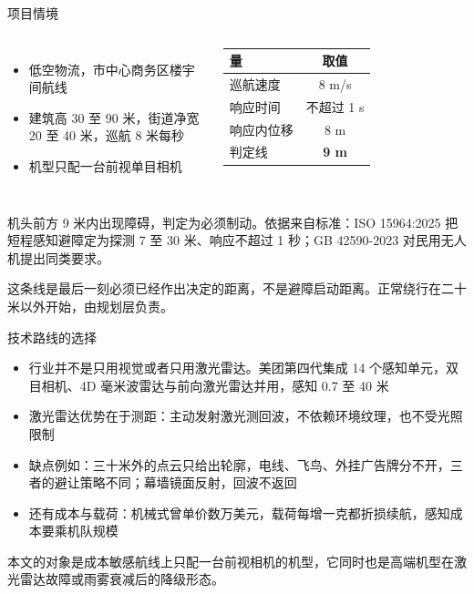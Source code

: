 \documentclass[serif, aspectratio=169]{beamer}
\newcommand{\currentref}{}
\newcommand{\src}[1]{\gdef\currentref{#1}}
\begin{document}
\begin{frame}{项目情境}

\begin{columns}[T]
\begin{itemize}
    \item 低空物流，市中心商务区楼宇间航线
    \item 建筑高 30 至 90 米，街道净宽 20 至 40 米，巡航 8 米每秒
    \item 机型只配一台前视单目相机
\end{itemize}

\centering
\small
\begin{tabular}{@{}lc@{}}
\toprule
量 & 取值 \\
\midrule
巡航速度 & 8 m/s \\
响应时间 & 不超过 1 s \\
响应内位移 & 8 m \\
判定线 & \textbf{9 m} \\
\bottomrule
\end{tabular}
\end{columns}

\vspace{0.25cm}
机头前方 9 米内出现障碍，判定为必须制动。依据来自标准：ISO 15964:2025 把短程感知避障定为探测 7 至 30 米、响应不超过 1 秒；GB 42590-2023 对民用无人机提出同类要求。

\vspace{0.15cm}
{\small 这条线是最后一刻必须已经作出决定的距离，不是避障启动距离。正常绕行在二十米以外开始，由规划层负责。}

\src{ISO 15964:2025. Detection and avoidance systems for uncrewed aircraft systems. ISO, 2025.}
\end{frame}

\begin{frame}{技术路线的选择}

{\footnotesize
\begin{itemize}\setlength{\itemsep}{1pt}
    \item 行业并不是只用视觉或者只用激光雷达。美团第四代集成 14 个感知单元，双目相机、4D 毫米波雷达与前向激光雷达并用，感知 0.7 至 40 米
    \item 激光雷达优势在于测距：主动发射激光测回波，不依赖环境纹理，也不受光照限制
    \item 缺点例如：三十米外的点云只给出轮廓，电线、飞鸟、外挂广告牌分不开，三者的避让策略不同；幕墙镜面反射，回波不返回
    \item 还有成本与载荷：机械式曾单价数万美元，载荷每增一克都折损续航，感知成本要乘机队规模
\end{itemize}}

\vspace{0.3cm}
{\small 本文的对象是成本敏感航线上只配一台前视相机的机型，它同时也是高端机型在激光雷达故障或雨雾衰减后的降级形态。}

\src{Liang Y, Deng B, Liu W, Qin J, He S. Monocular Depth Estimation for Glass Walls With Context. IEEE TPAMI, 2023.}
\end{frame}
\end{document}
